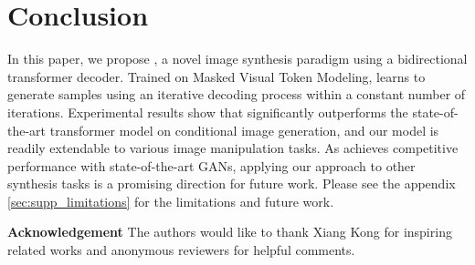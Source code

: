\section{Conclusion}

In this paper, we propose \model, a novel image synthesis paradigm using a bidirectional transformer decoder. Trained on Masked Visual Token Modeling, \model learns to generate samples using an iterative decoding process within a constant number of iterations. Experimental results show that \model significantly outperforms the state-of-the-art transformer model on conditional image generation, and our model is readily extendable to various image manipulation tasks. As \model achieves competitive performance with state-of-the-art GANs, applying our approach to other synthesis tasks is a promising direction for future work. Please see the appendix \ref{sec:supp_limitations} for the limitations and future work.


\noindent \textbf{Acknowledgement} 
The authors would like to thank Xiang Kong for inspiring related works and anonymous reviewers for helpful comments.